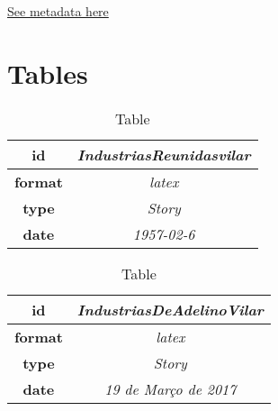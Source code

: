 
\hyperref[table:\arabic{tablecounter}]{See metadata here}

\newpage



\section{Tables}


\begin{table}[h]
    \centering
    \begin{tabular}{|c|c|}
        \hline
        
            \textbf{ id } & \textit{ IndustriasReunidasvilar } \\
            \hline
        
            \textbf{ format } & \textit{ latex } \\
            \hline
        
            \textbf{ type } & \textit{ Story } \\
            \hline
        
            \textbf{ date } & \textit{ 1957-02-6 } \\
            \hline
        
    \end{tabular}
    \caption{Table } %
    \label{table:\arabic{tablecounter2}} %
\end{table}

\begin{table}[h]
    \centering
    \begin{tabular}{|c|c|}
        \hline
        
            \textbf{ id } & \textit{ IndustriasDeAdelinoVilar } \\
            \hline
        
            \textbf{ format } & \textit{ latex } \\
            \hline
        
            \textbf{ type } & \textit{ Story } \\
            \hline
        
            \textbf{ date } & \textit{ 19 de Março de 2017 } \\
            \hline
        
    \end{tabular}
    \caption{Table } %
    \label{table:\arabic{tablecounter2}} %
\end{table}


